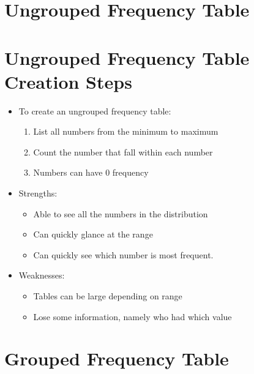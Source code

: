 \documentclass[12pt]{article}
\begin{document}
\section{Ungrouped Frequency Table}\label{ungrouped-frequency-table}
\vspace{2in} 

\section{Ungrouped Frequency Table Creation
Steps}\label{ungrouped-frequency-table-creation-steps}

\begin{itemize}
\itemsep1pt\parskip0pt
\item
  To create an ungrouped frequency table:

  \begin{enumerate}
  \def\labelenumi{\arabic{enumi}.}
  \itemsep1pt\parskip0pt
  \item
    List all numbers from the minimum to maximum
  \item
    Count the number that fall within each number
  \item
    Numbers can have 0 frequency
  \end{enumerate}
\item
  Strengths:

  \begin{itemize}
  \itemsep1pt\parskip0pt
  \item
    Able to see all the numbers in the distribution
  \item
    Can quickly glance at the range
  \item
    Can quickly see which number is most frequent.
  \end{itemize}
\item
  Weaknesses:

  \begin{itemize}
  \itemsep1pt\parskip0pt
  \item
    Tables can be large depending on range
  \item
    Lose some information, namely who had which value
  \end{itemize}
\end{itemize}

\section{Grouped Frequency Table}\label{grouped-frequency-table}
\end{document}
